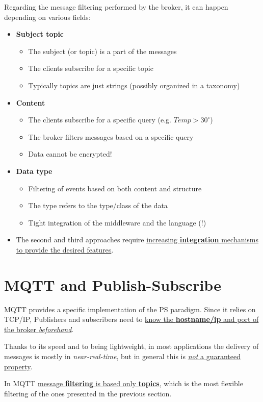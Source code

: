 Regarding the message filtering performed by the broker, it can happen depending on various fields:
\begin{itemize}
   \item \textbf{Subject topic}
   \begin{itemize}
      \item The subject (or topic) is a part of the messages
      \item The clients subscribe for a specific topic
      \item Typically topics are just strings (possibly organized in a taxonomy)
   \end{itemize}
   \item \textbf{Content}
   \begin{itemize}
      \item  The clients subscribe for a specific query (e.g. $Temp > 30^{\circ}$)
      \item The broker filters messages based on a specific query
      \item Data cannot be encrypted!
   \end{itemize}
   \item \textbf{Data type}
   \begin{itemize}
      \item Filtering of events based on both content and structure
      \item The type refers to the type/class of the data
      \item Tight integration of the middleware and the language (!) 
   \end{itemize}
   \item[] The second and third approaches require \ul{increasing \textbf{integration} mechanisms to provide the desired features}.
\end{itemize}

\section{MQTT and Publish-Subscribe}
MQTT provides a specific implementation of the PS paradigm.
Since it relies on TCP/IP, Publishers and subscribers need to \ul{know the
\textbf{hostname/ip} and port of the broker
\textit{beforehand}}.

Thanks to its speed and to being lightweight, in most applications the delivery of messages is
mostly in \textit{near-real-time}, but in general this is \ul{\textit{not} a guaranteed property}.

In MQTT \ul{message \textbf{filtering} is based only \textbf{topics}}, which is the most flexible filtering of the ones presented in the previous section.


